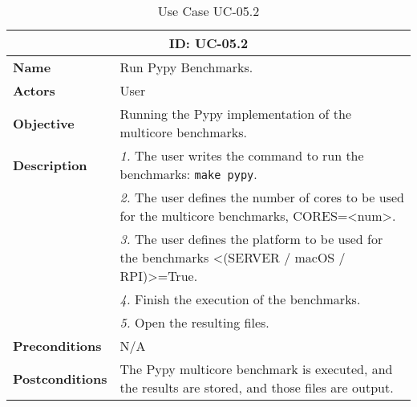 \begin{table}[H]
    \centering
    \begin{tabular}{l p{10cm}}
        \toprule
        \multicolumn{2}{c}{\textbf{ID: UC-05.2}} \\
        \toprule
        \textbf{Name}                         &  Run Pypy Benchmarks. \\
        \textbf{Actors}                       &  User \\
        \textbf{Objective}                    &  Running the Pypy implementation of the multicore benchmarks. \\
        \multirow{1}{*}{\textbf{Description}} & \textsl{1.} The user writes the command to run the benchmarks: \texttt{make pypy}.\\
                                              & \textsl{2.} The user defines the number of cores to be used for the multicore benchmarks, CORES=<num>.\\
                                              & \textsl{3.} The user defines the platform to be used for the benchmarks <(SERVER / macOS / RPI)>=True.\\
                                              & \textsl{4.} Finish the execution of the benchmarks.\\
                                              & \textsl{5.} Open the resulting files.\\ 
        \textbf{Preconditions}                &  N/A \\
        \textbf{Postconditions}               &  The Pypy multicore benchmark is executed, and the results are stored, and those files are output. \\
    \end{tabular}
    \caption{Use Case UC-05.2}
    \label{tab:uc-05.2}
\end{table}



